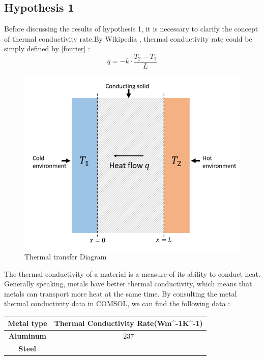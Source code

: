 \documentclass[12pt]{article}
\numberwithin{equation}{section}
\begin{document}
\subsection{Hypothesis 1}
Before discussing the results of hypothesis 1, it is necessary to clarify the concept of thermal conductivity rate.By Wikipedia %
, thermal conductivity rate could be simply defined by \ref{fourier} :
\begin{equation}
	q=-k \cdot \frac{T_{2}-T_{1}}{L} \label{fourier}
\end{equation}
\begin{figure}[H] %
\centering %
\includegraphics[width=.5\textwidth]{ThermalTransfer.png} %
\caption{Thermal transfer Diagram} %
\end{figure}\label{Heattranfer}


The thermal conductivity of a material is a measure of its ability to conduct heat. Generally speaking, metals have better thermal conductivity, which means that metals can transport more heat at the same time. By consulting the metal thermal conductivity data in COMSOL, we can find the following data  :


% 
\begin{table}[H]
\centering
\begin{tabular}{|c|c|}
\hline

\textbf{Metal type} & Thermal Conductivity Rate(Wm\textasciicircum{}-1K\textasciicircum{}-1) \\ \hline
\textbf{Aluminum}   & 237                                                                    \\ \hline
\textbf{Steel}      & \cellcolor[HTML]{F8F9FA}{\color[HTML]{202122} 80}                      \\ \hline


\end{tabular}
\end{table}
\end{document}
